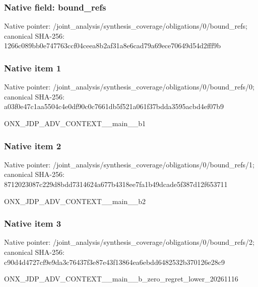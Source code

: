 \documentclass[10pt,a4paper]{article}
\begin{document}
\subsubsection{Native field: bound\_\allowbreak{}refs}
Native pointer: /joint\_\allowbreak{}analysis/synthesis\_\allowbreak{}coverage/obligations/0/bound\_\allowbreak{}refs; canonical SHA-256: 1266c089bb0e747763ccf04ceea8b2af31a8e6cad79a69ece70649d54d2fff9b

\subsubsection{Native item 1}
Native pointer: /joint\_\allowbreak{}analysis/synthesis\_\allowbreak{}coverage/obligations/0/bound\_\allowbreak{}refs/0; canonical SHA-256: a03f0e47c1aa5504c4e0df90c0c7661db5f521a061f37bdda3595acbd4ef07b9

\begingroup\raggedright\sloppy ONX\_\allowbreak{}JDP\_\allowbreak{}ADV\_\allowbreak{}CONTEXT\_\allowbreak{}\_\allowbreak{}main\_\allowbreak{}\_\allowbreak{}b1\par\endgroup

\subsubsection{Native item 2}
Native pointer: /joint\_\allowbreak{}analysis/synthesis\_\allowbreak{}coverage/obligations/0/bound\_\allowbreak{}refs/1; canonical SHA-256: 8712023087c229d8bdd7314624a677b4318ee7fa1b49dcade5f387d12f653711

\begingroup\raggedright\sloppy ONX\_\allowbreak{}JDP\_\allowbreak{}ADV\_\allowbreak{}CONTEXT\_\allowbreak{}\_\allowbreak{}main\_\allowbreak{}\_\allowbreak{}b2\par\endgroup

\subsubsection{Native item 3}
Native pointer: /joint\_\allowbreak{}analysis/synthesis\_\allowbreak{}coverage/obligations/0/bound\_\allowbreak{}refs/2; canonical SHA-256: c90d4d4727cf9e9da3c76437f3e87e43f13864ea6ebdd6482532b370126e28c9

\begingroup\raggedright\sloppy ONX\_\allowbreak{}JDP\_\allowbreak{}ADV\_\allowbreak{}CONTEXT\_\allowbreak{}\_\allowbreak{}main\_\allowbreak{}\_\allowbreak{}b\_\allowbreak{}zero\_\allowbreak{}regret\_\allowbreak{}lower\_\allowbreak{}20261116\par\endgroup
\end{document}
